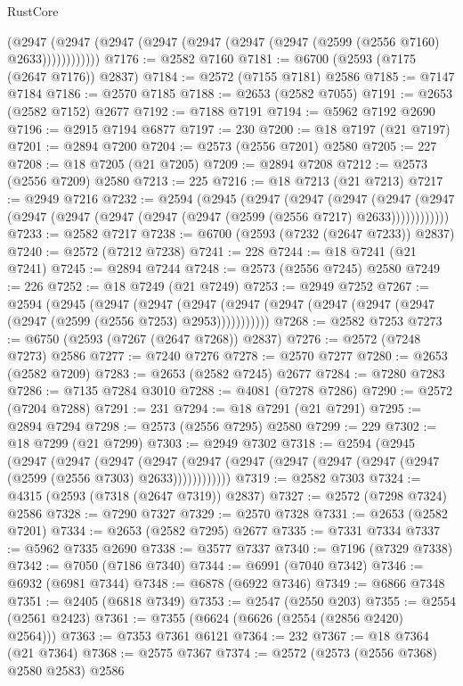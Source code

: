 \begin{lexlean}{RustCore}
\begin{coremodule}
            (@2947 (@2947 (@2947 (@2947 (@2947 (@2947 (@2947 (@2599 (@2556 @7160) @2633))))))))))))
@7176 := @2582 @7160
@7181 := @6700 (@2593 (@7175 (@2647 @7176)) @2837)
@7184 := @2572 (@7155 @7181) @2586
@7185 := @7147 @7184
@7186 := @2570 @7185
@7188 := @2653 (@2582 @7055)
@7191 := @2653 (@2582 @7152) @2677
@7192 := @7188 @7191
@7194 := @5962 @7192 @2690
@7196 := @2915 @7194 @6877
@7197 := 230
@7200 := @18 @7197 (@21 @7197)
@7201 := @2894 @7200
@7204 := @2573 (@2556 @7201) @2580
@7205 := 227
@7208 := @18 @7205 (@21 @7205)
@7209 := @2894 @7208
@7212 := @2573 (@2556 @7209) @2580
@7213 := 225
@7216 := @18 @7213 (@21 @7213)
@7217 := @2949 @7216
@7232 := @2594
    (@2945
      (@2947
        (@2947
          (@2947
            (@2947 (@2947 (@2947 (@2947 (@2947 (@2947 (@2947 (@2599 (@2556 @7217) @2633))))))))))))
@7233 := @2582 @7217
@7238 := @6700 (@2593 (@7232 (@2647 @7233)) @2837)
@7240 := @2572 (@7212 @7238)
@7241 := 228
@7244 := @18 @7241 (@21 @7241)
@7245 := @2894 @7244
@7248 := @2573 (@2556 @7245) @2580
@7249 := 226
@7252 := @18 @7249 (@21 @7249)
@7253 := @2949 @7252
@7267 := @2594
    (@2945
      (@2947
        (@2947
          (@2947 (@2947 (@2947 (@2947 (@2947 (@2947 (@2947 (@2599 (@2556 @7253) @2953)))))))))))
@7268 := @2582 @7253
@7273 := @6750 (@2593 (@7267 (@2647 @7268)) @2837)
@7276 := @2572 (@7248 @7273) @2586
@7277 := @7240 @7276
@7278 := @2570 @7277
@7280 := @2653 (@2582 @7209)
@7283 := @2653 (@2582 @7245) @2677
@7284 := @7280 @7283
@7286 := @7135 @7284 @3010
@7288 := @4081 (@7278 @7286)
@7290 := @2572 (@7204 @7288)
@7291 := 231
@7294 := @18 @7291 (@21 @7291)
@7295 := @2894 @7294
@7298 := @2573 (@2556 @7295) @2580
@7299 := 229
@7302 := @18 @7299 (@21 @7299)
@7303 := @2949 @7302
@7318 := @2594
    (@2945
      (@2947
        (@2947
          (@2947
            (@2947 (@2947 (@2947 (@2947 (@2947 (@2947 (@2947 (@2599 (@2556 @7303) @2633))))))))))))
@7319 := @2582 @7303
@7324 := @4315 (@2593 (@7318 (@2647 @7319)) @2837)
@7327 := @2572 (@7298 @7324) @2586
@7328 := @7290 @7327
@7329 := @2570 @7328
@7331 := @2653 (@2582 @7201)
@7334 := @2653 (@2582 @7295) @2677
@7335 := @7331 @7334
@7337 := @5962 @7335 @2690
@7338 := @3577 @7337
@7340 := @7196 (@7329 @7338)
@7342 := @7050 (@7186 @7340)
@7344 := @6991 (@7040 @7342)
@7346 := @6932 (@6981 @7344)
@7348 := @6878 (@6922 @7346)
@7349 := @6866 @7348
@7351 := @2405 (@6818 @7349)
@7353 := @2547 (@2550 @203)
@7355 := @2554 (@2561 @2423)
@7361 := @7355 (@6624 (@6626 (@2554 (@2856 @2420) @2564)))
@7363 := @7353 @7361 @6121
@7364 := 232
@7367 := @18 @7364 (@21 @7364)
@7368 := @2575 @7367
@7374 := @2572 (@2573 (@2556 @7368) @2580 @2583) @2586

\end{coremodule}
\end{lexlean}
